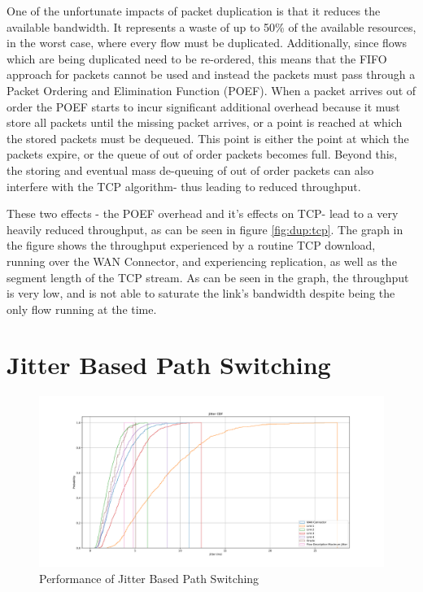 One of the unfortunate impacts of packet duplication is that it reduces the available bandwidth. It represents a waste of up to 50\% of the available resources, in the worst case, where every flow must be duplicated. Additionally, since flows which are being duplicated need to be re-ordered, this means that the FIFO approach for packets cannot be used and instead the packets must pass through a Packet Ordering and Elimination Function (POEF). When a packet arrives out of order the POEF starts to incur significant additional overhead because it must store all packets until the missing packet arrives, or a point is reached at which the stored packets must be dequeued. This point is either the point at which the packets expire, or the queue of out of order packets becomes full. Beyond this, the storing and eventual mass de-queuing of out of order packets can also interfere with the TCP algorithm- thus leading to reduced throughput.

These two effects - the POEF overhead and it's effects on TCP- lead to a very heavily reduced throughput, as can be seen in figure \ref{fig:dup:tcp}. The graph in the figure shows the throughput experienced by a routine TCP download, running over the WAN Connector, and experiencing replication, as well as the segment length of the TCP stream. As can be seen in the graph, the throughput is very low, and is not able to saturate the link's bandwidth despite being the only flow running at the time.

\section{Jitter Based Path Switching}

\begin{figure}[h]
    \centering
        \includegraphics[height=0.66\textwidth,width=\textwidth]{fig/jitter_cdf.pdf}
        \caption{Performance of Jitter Based Path Switching}
        \label{fig:jitter_cdf}
\end{figure}


